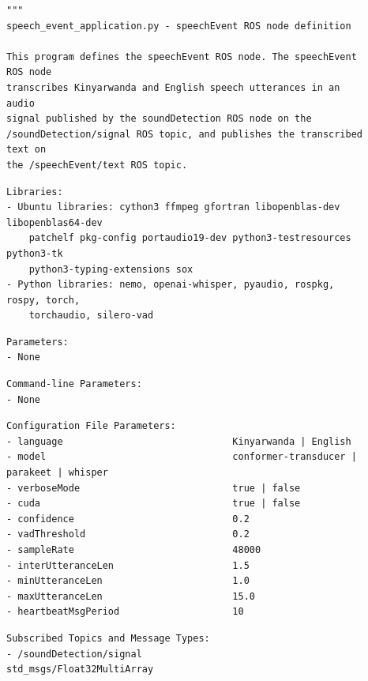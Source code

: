 \documentclass{CSSRforAfrica}
\newcommand{\checkboxChecked}{\fbox{\ding{51}}} %
\begin{document}
\begin{description}

\item[\checkboxChecked] 
 {\small 
\begin{verbatim}
"""
speech_event_application.py - speechEvent ROS node definition

This program defines the speechEvent ROS node. The speechEvent ROS node
transcribes Kinyarwanda and English speech utterances in an audio
signal published by the soundDetection ROS node on the
/soundDetection/signal ROS topic, and publishes the transcribed text on
the /speechEvent/text ROS topic.
\end{verbatim}}

\item[\checkboxChecked] 
 {\small 
\begin{verbatim}
Libraries:
- Ubuntu libraries: cython3 ffmpeg gfortran libopenblas-dev libopenblas64-dev
    patchelf pkg-config portaudio19-dev python3-testresources python3-tk
    python3-typing-extensions sox
- Python libraries: nemo, openai-whisper, pyaudio, rospkg, rospy, torch,
    torchaudio, silero-vad
\end{verbatim}}

\item[\checkboxChecked] 
 {\small 
\begin{verbatim}
Parameters:
- None
\end{verbatim}}

\item[\checkboxChecked] 
 {\small 
\begin{verbatim}
Command-line Parameters:
- None
\end{verbatim}}

\item[\checkboxChecked] 
 {\small 
\begin{verbatim}
Configuration File Parameters:
- language                              Kinyarwanda | English
- model                                 conformer-transducer | parakeet | whisper
- verboseMode                           true | false
- cuda                                  true | false
- confidence                            0.2
- vadThreshold                          0.2
- sampleRate                            48000
- interUtteranceLen                     1.5
- minUtteranceLen                       1.0
- maxUtteranceLen                       15.0
- heartbeatMsgPeriod                    10
\end{verbatim}}

\item[\checkboxChecked] 
 {\small 
\begin{verbatim}
Subscribed Topics and Message Types:
- /soundDetection/signal                std_msgs/Float32MultiArray
\end{verbatim}}


\end{description}
\end{document}
